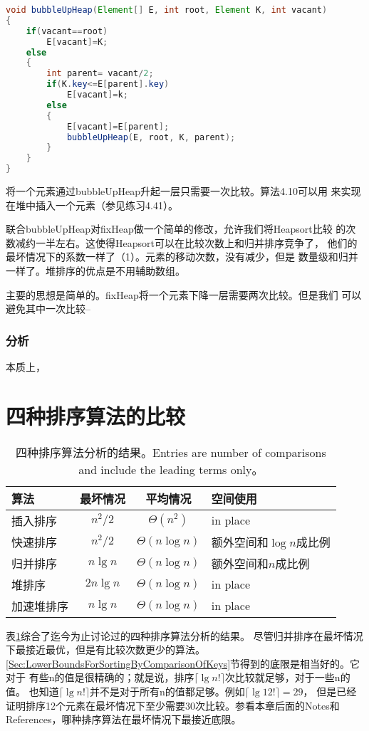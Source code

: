 \begin{lstlisting}[language={Java}, keywordstyle=\color{blue!70}, commentstyle=\color{red!50!green!50!blue!50}]
void bubbleUpHeap(Element[] E, int root, Element K, int vacant)
{
    if(vacant==root)
        E[vacant]=K;
    else
    {
        int parent= vacant/2;
        if(K.key<=E[parent].key)
            E[vacant]=k;
        else
        {
            E[vacant]=E[parent];
            bubbleUpHeap(E, root, K, parent);
        }
    }
}
\end{lstlisting}

将一个元素通过bubbleUpHeap升起一层只需要一次比较。算法4.10可以用
来实现在堆中插入一个元素（参见练习4.41）。

联合bubbleUpHeap对fixHeap做一个简单的修改，允许我们将Heapsort比较
的次数减约一半左右。这使得Heapsort可以在比较次数上和归并排序竞争了，
他们的最坏情况下的系数一样了（1）。元素的移动次数，没有减少，但是
数量级和归并一样了。堆排序的优点是不用辅助数组。

主要的思想是简单的。fixHeap将一个元素下降一层需要两次比较。但是我们
可以避免其中一次比较--

\subsubsection{分析}
本质上，

\section{四种排序算法的比较}
\begin{table}
\centering
\begin{tabular}{lccl}
    \hline
    算法   &最坏情况 &平均情况 &空间使用 \\
    \hline
    插入排序   &$n^2/2$    &$\Theta(n^2)$     &in place\\
    快速排序   &$n^2/2$    &$\Theta(n\log n)$ &额外空间和$\log n$成比例\\
    归并排序   &$n\lg n$   &$\Theta(n\log n)$ &额外空间和$n$成比例\\
    堆排序     &$2n\lg n$  &$\Theta(n\log n)$ &in place\\
    加速堆排序 &$n\lg n$   &$\Theta(n\log n)$ &in place\\
    \hline
\end{tabular}
\caption{四种排序算法分析的结果。Entries are number of comparisons and include the leading terms only。}
\label{Table:CompareOf4Algorithm} \centering
\end{table}
表\ref{Table:CompareOf4Algorithm}综合了迄今为止讨论过的四种排序算法分析的结果。
尽管归并排序在最坏情况下最接近最优，但是有比较次数更少的算法。
\ref{Sec:LowerBoundsForSortingByComparisonOfKeys}节得到的底限是相当好的。它对于
有些n的值是很精确的；就是说，排序$\lceil\lg n!\rceil$次比较就足够，对于一些n的值。
也知道$\lceil\lg n!\rceil$并不是对于所有n的值都足够。例如$\lceil\lg 12!\rceil=29$，
但是已经证明排序12个元素在最坏情况下至少需要30次比较。参看本章后面的Notes和
References，哪种排序算法在最坏情况下最接近底限。

